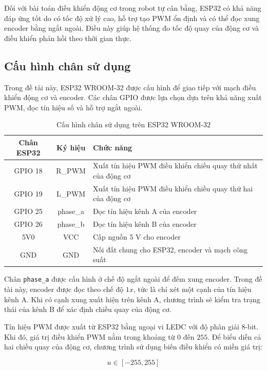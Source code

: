 Đối với bài toán điều khiển động cơ trong robot tự cân bằng, ESP32 có khả năng đáp ứng tốt do có tốc độ xử lý cao, hỗ trợ tạo PWM ổn định và có thể đọc xung encoder bằng ngắt ngoài. Điều này giúp hệ thống đo tốc độ quay của động cơ và điều khiển phản hồi theo thời gian thực.

\subsection{Cấu hình chân sử dụng}

Trong đề tài này, ESP32 WROOM-32 được cấu hình để giao tiếp với mạch điều khiển động cơ và encoder. Các chân GPIO được lựa chọn dựa trên khả năng xuất PWM, đọc tín hiệu số và hỗ trợ ngắt ngoài.

\begin{table}[H]
\centering
\caption{Cấu hình chân sử dụng trên ESP32 WROOM-32}
\label{tab:esp32_pin_config}
\begin{tabular}{|c|c|l|}
\hline
\textbf{Chân ESP32} & \textbf{Ký hiệu} & \textbf{Chức năng} \\ \hline
GPIO 18 & R\_PWM & Xuất tín hiệu PWM điều khiển chiều quay thứ nhất của động cơ \\ \hline
GPIO 19 & L\_PWM & Xuất tín hiệu PWM điều khiển chiều quay thứ hai của động cơ \\ \hline
GPIO 25 & phase\_a & Đọc tín hiệu kênh A của encoder \\ \hline
GPIO 26 & phase\_b & Đọc tín hiệu kênh B của encoder \\ \hline
5V0 & VCC & Cấp nguồn 5 V cho encoder \\ \hline
GND & GND & Nối đất chung cho ESP32, encoder và mạch công suất \\ \hline
\end{tabular}
\end{table}

Chân \texttt{phase\_a} được cấu hình ở chế độ ngắt ngoài để đếm xung encoder. Trong đề tài này, encoder được đọc theo chế độ $1x$, tức là chỉ xét một cạnh của tín hiệu kênh A. Khi có cạnh xung xuất hiện trên kênh A, chương trình sẽ kiểm tra trạng thái của kênh B để xác định chiều quay của động cơ.

Tín hiệu PWM được xuất từ ESP32 bằng ngoại vi LEDC với độ phân giải 8-bit. Khi đó, giá trị điều khiển PWM nằm trong khoảng từ $0$ đến $255$. Để biểu diễn cả hai chiều quay của động cơ, chương trình sử dụng biến điều khiển có miền giá trị:

\begin{equation}
    u \in [-255, 255]
\end{equation}

